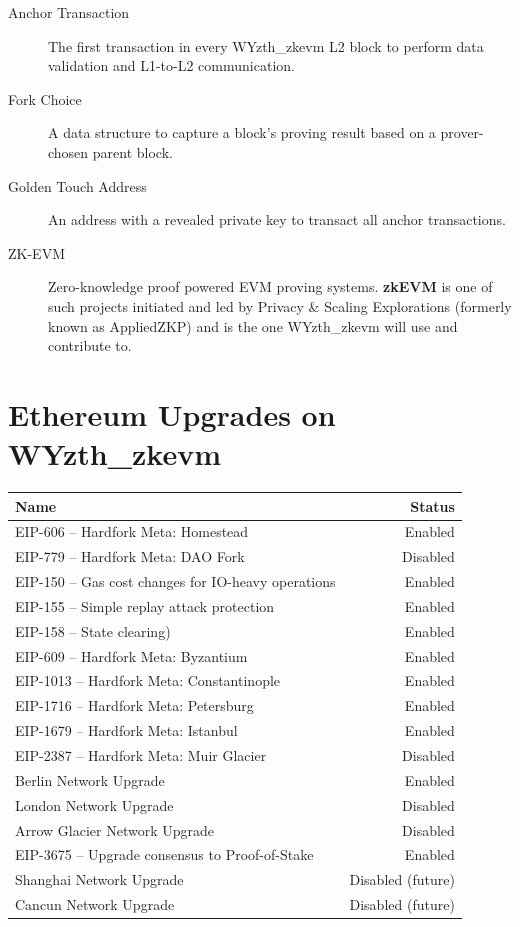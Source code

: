 \documentclass[9pt,oneside]{amsart}
\begin{document}
\begin{description}
\item[Anchor Transaction] The first transaction in every WYzth_zkevm L2 block to perform data validation and L1-to-L2 communication.


\item[Fork Choice] A data structure to capture a block's proving result based on a prover-chosen parent block.

\item[Golden Touch Address] An address with a revealed private key to transact all anchor transactions.

\item[ZK-EVM] Zero-knowledge proof powered EVM proving systems. \textbf{zkEVM} is one of such projects initiated and led by 
Privacy \& Scaling Explorations (formerly known as AppliedZKP)\cite{pse} and is the one WYzth_zkevm will use and contribute to.
\end{description}

\section{Ethereum Upgrades on WYzth_zkevm}\label{sec:eips}

\begin{tabu}{l r }
\toprule
Name & Status \\
\midrule
EIP-606 -- Hardfork Meta: Homestead & \quad \quad \quad \quad \quad \quad \quad \quad \quad \quad \quad \quad \quad \quad \quad \quad \quad \quad \quad \quad \quad \quad  Enabled \\
EIP-779 -- Hardfork Meta: DAO Fork & Disabled \\
EIP-150 -- Gas cost changes for IO-heavy operations & Enabled \\
EIP-155 -- Simple replay attack protection &  Enabled \\
EIP-158 -- State clearing) & Enabled \\
EIP-609 -- Hardfork Meta: Byzantium & Enabled \\
EIP-1013 -- Hardfork Meta: Constantinople & Enabled \\
EIP-1716 -- Hardfork Meta: Petersburg & Enabled \\
EIP-1679 -- Hardfork Meta: Istanbul & Enabled \\
EIP-2387 -- Hardfork Meta: Muir Glacier & Disabled \\
Berlin Network Upgrade & Enabled \\
London Network Upgrade & Disabled \\
Arrow Glacier Network Upgrade & Disabled \\
EIP-3675 -- Upgrade consensus to Proof-of-Stake & Enabled \\
Shanghai Network Upgrade & Disabled (future) \\
Cancun Network Upgrade & Disabled (future)  \\
\bottomrule
\end{tabu}
\end{document}
